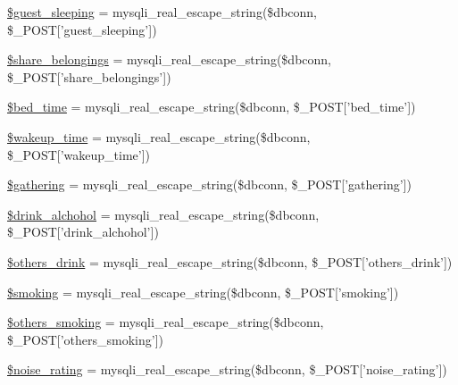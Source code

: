 \begin{DoxyCompactItemize}
\item 
\hyperlink{admin__view_2validate_2studentVal_8php_a30ca6680bf78675c5916e0c0114191fb}{\$guest\-\_\-sleeping} = mysqli\-\_\-real\-\_\-escape\-\_\-string(\$dbconn, \$\-\_\-\-P\-O\-S\-T\mbox{[}'guest\-\_\-sleeping'\mbox{]})
\item 
\hyperlink{admin__view_2validate_2studentVal_8php_ad62de11903542434007800bf0bc24594}{\$share\-\_\-belongings} = mysqli\-\_\-real\-\_\-escape\-\_\-string(\$dbconn, \$\-\_\-\-P\-O\-S\-T\mbox{[}'share\-\_\-belongings'\mbox{]})
\item 
\hyperlink{admin__view_2validate_2studentVal_8php_a08edd61848021bc8ed4c15804842d5fb}{\$bed\-\_\-time} = mysqli\-\_\-real\-\_\-escape\-\_\-string(\$dbconn, \$\-\_\-\-P\-O\-S\-T\mbox{[}'bed\-\_\-time'\mbox{]})
\item 
\hyperlink{admin__view_2validate_2studentVal_8php_ade31df5f8971826d6902226d01975007}{\$wakeup\-\_\-time} = mysqli\-\_\-real\-\_\-escape\-\_\-string(\$dbconn, \$\-\_\-\-P\-O\-S\-T\mbox{[}'wakeup\-\_\-time'\mbox{]})
\item 
\hyperlink{admin__view_2validate_2studentVal_8php_a0b341ac1da1798a6803878383a2a6086}{\$gathering} = mysqli\-\_\-real\-\_\-escape\-\_\-string(\$dbconn, \$\-\_\-\-P\-O\-S\-T\mbox{[}'gathering'\mbox{]})
\item 
\hyperlink{admin__view_2validate_2studentVal_8php_a155e4a24650f8440d97423fe1d652eb7}{\$drink\-\_\-alchohol} = mysqli\-\_\-real\-\_\-escape\-\_\-string(\$dbconn, \$\-\_\-\-P\-O\-S\-T\mbox{[}'drink\-\_\-alchohol'\mbox{]})
\item 
\hyperlink{admin__view_2validate_2studentVal_8php_ad8d98a0ffa836c8f5ff6cd94cc18dca1}{\$others\-\_\-drink} = mysqli\-\_\-real\-\_\-escape\-\_\-string(\$dbconn, \$\-\_\-\-P\-O\-S\-T\mbox{[}'others\-\_\-drink'\mbox{]})
\item 
\hyperlink{admin__view_2validate_2studentVal_8php_a266c5c8c450a524f2b62297da83a6461}{\$smoking} = mysqli\-\_\-real\-\_\-escape\-\_\-string(\$dbconn, \$\-\_\-\-P\-O\-S\-T\mbox{[}'smoking'\mbox{]})
\item 
\hyperlink{admin__view_2validate_2studentVal_8php_a41f287196869fc73324563f84fc1ea73}{\$others\-\_\-smoking} = mysqli\-\_\-real\-\_\-escape\-\_\-string(\$dbconn, \$\-\_\-\-P\-O\-S\-T\mbox{[}'others\-\_\-smoking'\mbox{]})
\item 
\hyperlink{admin__view_2validate_2studentVal_8php_a92d14fe0154487caa69f117986fb08da}{\$noise\-\_\-rating} = mysqli\-\_\-real\-\_\-escape\-\_\-string(\$dbconn, \$\-\_\-\-P\-O\-S\-T\mbox{[}'noise\-\_\-rating'\mbox{]})

\end{DoxyCompactItemize}

